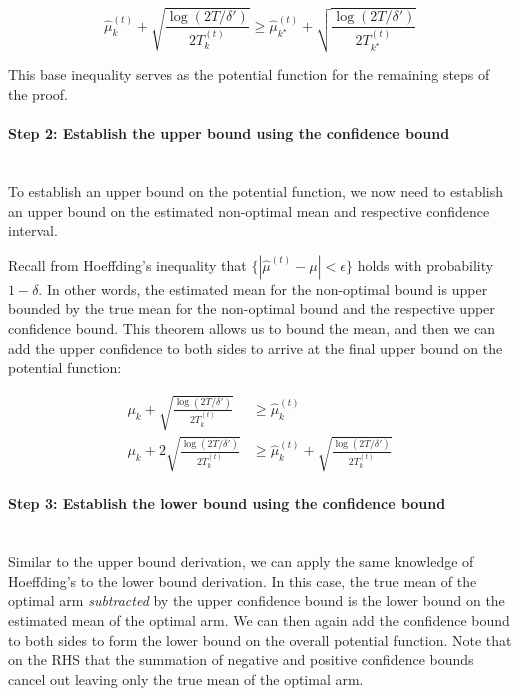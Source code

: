 \documentclass[11pt]{article}
\begin{document}
\begin{equation}
    \hat{\mu}_k^{(t)} + \sqrt{\frac{\log(2T/\delta')}{2T_k^{(t)}}} \geq \hat{\mu}_{k^{\star}}^{(t)} + \sqrt{\frac{\log(2T/\delta')}{2T_{k^{\star}}^{(t)}}}
\end{equation}

This base inequality serves as the potential function for the remaining steps of the proof.

\paragraph{Step 2: Establish the upper bound using the confidence bound}
\noindent \\
To establish an upper bound on the potential function, we now need to establish an upper bound on the estimated non-optimal mean and respective confidence interval. 

Recall from Hoeffding's inequality that $\{ |\hat{\mu}^{(t)} - \mu| < \epsilon \}$ holds with probability $1-\delta$. In other words, the estimated mean for the non-optimal bound is upper bounded by the true mean for the non-optimal bound and the respective upper confidence bound. This theorem allows us to bound the mean, and then we can add the upper confidence to both sides to arrive at the final upper bound on the potential function:

\begin{align}
    \mu_k + \sqrt{\frac{\log(2T/\delta')}{2T_k^{(t)}}} &\geq \hat{\mu}_k^{(t)} \\ 
    \mu_k + 2\sqrt{\frac{\log(2T/\delta')}{2T_k^{(t)}}} &\geq \hat{\mu}_k^{(t)} + \sqrt{\frac{\log(2T/\delta')}{2T_k^{(t)}}}
\end{align}

\paragraph{Step 3: Establish the lower bound using the confidence bound}
\noindent \\
Similar to the upper bound derivation, we can apply the same knowledge of Hoeffding's to the lower bound derivation. In this case, the true mean of the optimal arm \textit{subtracted} by the upper confidence bound is the lower bound on the estimated mean of the optimal arm. We can then again add the confidence bound to both sides to form the lower bound on the overall potential function. Note that on the RHS that the summation of negative and positive confidence bounds cancel out leaving only the true mean of the optimal arm.
\end{document}

